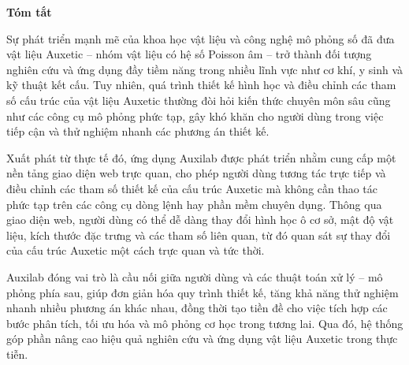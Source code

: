 \begin{center}
\textbf{\large{Tóm tắt}	}
\end{center}
Sự phát triển mạnh mẽ của khoa học vật liệu và công nghệ mô phỏng số đã đưa vật liệu Auxetic – nhóm vật liệu có hệ số Poisson âm – trở thành đối tượng nghiên cứu và ứng dụng đầy tiềm năng trong nhiều lĩnh vực như cơ khí, y sinh và kỹ thuật kết cấu. Tuy nhiên, quá trình thiết kế hình học và điều chỉnh các tham số cấu trúc của vật liệu Auxetic thường đòi hỏi kiến thức chuyên môn sâu cũng như các công cụ mô phỏng phức tạp, gây khó khăn cho người dùng trong việc tiếp cận và thử nghiệm nhanh các phương án thiết kế.

Xuất phát từ thực tế đó, ứng dụng Auxilab được phát triển nhằm cung cấp một nền tảng giao diện web trực quan, cho phép người dùng tương tác trực tiếp và điều chỉnh các tham số thiết kế của cấu trúc Auxetic mà không cần thao tác phức tạp trên các công cụ dòng lệnh hay phần mềm chuyên dụng. Thông qua giao diện web, người dùng có thể dễ dàng thay đổi hình học ô cơ sở, mật độ vật liệu, kích thước đặc trưng và các tham số liên quan, từ đó quan sát sự thay đổi của cấu trúc Auxetic một cách trực quan và tức thời.

Auxilab đóng vai trò là cầu nối giữa người dùng và các thuật toán xử lý – mô phỏng phía sau, giúp đơn giản hóa quy trình thiết kế, tăng khả năng thử nghiệm nhanh nhiều phương án khác nhau, đồng thời tạo tiền đề cho việc tích hợp các bước phân tích, tối ưu hóa và mô phỏng cơ học trong tương lai. Qua đó, hệ thống góp phần nâng cao hiệu quả nghiên cứu và ứng dụng vật liệu Auxetic trong thực tiễn.